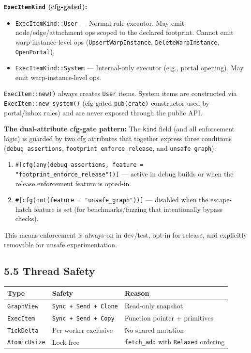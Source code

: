 \documentclass[
]{book}
\newcounter{none} %
\providecommand{\tightlist}{%
  \setlength{\itemsep}{0pt}\setlength{\parskip}{0pt}}
\begin{document}
\textbf{\texttt{ExecItemKind} (cfg-gated):}

\begin{itemize}
\tightlist
\item
  \texttt{ExecItemKind::User} --- Normal rule executor. May emit
  node/edge/attachment ops scoped to the declared footprint. Cannot emit
  warp-instance-level ops (\texttt{UpsertWarpInstance},
  \texttt{DeleteWarpInstance}, \texttt{OpenPortal}).
\item
  \texttt{ExecItemKind::System} --- Internal-only executor (e.g., portal
  opening). May emit warp-instance-level ops.
\end{itemize}

\texttt{ExecItem::new()} always creates \texttt{User} items. System items are
constructed via \texttt{ExecItem::new\_system()} (cfg-gated \texttt{pub(crate)}
constructor used by portal/inbox rules) and are never exposed through the public
API.

\textbf{The dual-attribute cfg-gate pattern:} The \texttt{kind} field (and all
enforcement logic) is guarded by two cfg attributes that together express three
conditions (\texttt{debug\_assertions}, \texttt{footprint\_enforce\_release},
and \texttt{unsafe\_graph}):

\begin{enumerate}
\def\labelenumi{\arabic{enumi}.}
\tightlist
\item
  \texttt{\#[cfg(any(debug\_assertions, feature = "footprint\_enforce\_release"))]}
  --- active in debug builds or when the release enforcement feature is
  opted-in.
\item
  \texttt{\#[cfg(not(feature = "unsafe\_graph"))]} --- disabled when the
  escape-hatch feature is set (for benchmarks/fuzzing that intentionally
  bypass checks).
\end{enumerate}

This means enforcement is always-on in dev/test, opt-in for release, and
explicitly removable for unsafe experimentation.

\subsection{5.5 Thread Safety}\label{thread-safety}

{\def\LTcaptype{none} %
\begin{longtable}[]{@{}lll@{}}
\toprule\noalign{}
Type & Safety & Reason \\
\midrule\noalign{}
\endhead
\bottomrule\noalign{}
\endlastfoot
\texttt{GraphView} & \texttt{Sync\ +\ Send\ +\ Clone} & Read-only
snapshot \\
\texttt{ExecItem} & \texttt{Sync\ +\ Send\ +\ Copy} & Function pointer +
primitives \\
\texttt{TickDelta} & Per-worker exclusive & No shared mutation \\
\texttt{AtomicUsize} & Lock-free & \texttt{fetch\_add} with
\texttt{Relaxed} ordering \\
\end{longtable}
}
\end{document}
